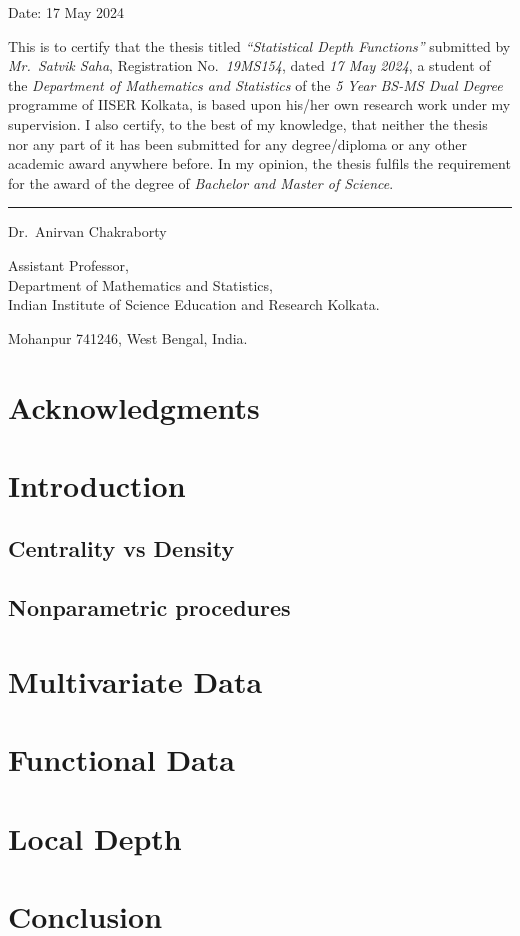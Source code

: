 \documentclass[12pt]{report}
\begin{document}
    Date: 17 May 2024

    This is to certify that the thesis titled \emph{``Statistical Depth
    Functions''} submitted by \emph{Mr.~Satvik Saha}, Registration
    No.~\emph{19MS154}, dated \emph{17 May 2024}, a student of the
    \textit{Department of Mathematics and Statistics} of the \textit{5 Year
    BS-MS Dual Degree} programme of IISER Kolkata, is based upon his/her own
    research work under my supervision.
    I also certify, to the best of my knowledge, that neither the thesis nor
    any part of it has been submitted for any degree/diploma or any other
    academic award anywhere before.
    In my opinion, the thesis fulfils the requirement for the award of the
    degree of \emph{Bachelor and Master of Science}.

    \vspace{5em}
    \rule{0.4\textwidth}{0.8pt}

    \vspace{0.1em}
    Dr.~Anirvan Chakraborty

    Assistant Professor,\\
    Department of Mathematics and Statistics,\\
    Indian Institute of Science Education and Research Kolkata.

    Mohanpur 741246, West Bengal, India.



    \chapter*{Acknowledgments}


    \tableofcontents


    \chapter{Introduction}
    

    \section{Centrality vs Density}
    \section{Nonparametric procedures}


    \chapter{Multivariate Data}
    


    \chapter{Functional Data}
    

    \chapter{Local Depth}
    \label{chap:localdepth}
    



    \chapter{Conclusion}
    


    \nocite{*}
    \printbibliography

    \appendix
\end{document}
